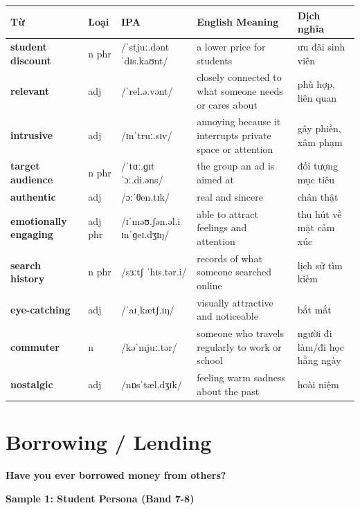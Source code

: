 \vspace{0.8em}
\begin{center}
\renewcommand{\arraystretch}{1.65}
\begin{tabularx}{\textwidth}{|V{0.22\textwidth}|C{0.07\textwidth}|I{0.20\textwidth}|Y|V{0.18\textwidth}|}
\hline
{}
\textbf{Từ} & \textbf{Loại} & \textbf{IPA} & \textbf{English Meaning} & \textbf{Dịch nghĩa} \\
\hline
\textbf{student discount} & n phr & /ˈstjuː.dənt ˈdɪs.kaʊnt/ & a lower price for students & ưu đãi sinh viên \\ \hline
\textbf{relevant} & adj & /ˈrel.ə.vənt/ & closely connected to what someone needs or cares about & phù hợp, liên quan \\ \hline
\textbf{intrusive} & adj & /ɪnˈtruː.sɪv/ & annoying because it interrupts private space or attention & gây phiền, xâm phạm \\ \hline
\textbf{target audience} & n phr & /ˈtɑː.ɡɪt ˈɔː.di.əns/ & the group an ad is aimed at & đối tượng mục tiêu \\ \hline
\textbf{authentic} & adj & /ɔːˈθen.tɪk/ & real and sincere & chân thật \\ \hline
\textbf{emotionally engaging} & adj phr & /ɪˈməʊ.ʃən.əl.i ɪnˈɡeɪ.dʒɪŋ/ & able to attract feelings and attention & thu hút về mặt cảm xúc \\ \hline
\textbf{search history} & n phr & /sɜːtʃ ˈhɪs.tər.i/ & records of what someone searched online & lịch sử tìm kiếm \\ \hline
\textbf{eye-catching} & adj & /ˈaɪˌkætʃ.ɪŋ/ & visually attractive and noticeable & bắt mắt \\ \hline
\textbf{commuter} & n & /kəˈmjuː.tər/ & someone who travels regularly to work or school & người đi làm/đi học hằng ngày \\ \hline
\textbf{nostalgic} & adj & /nɒsˈtæl.dʒɪk/ & feeling warm sadness about the past & hoài niệm \\ \hline
\end{tabularx}
\end{center}

\newpage

\section{Borrowing / Lending}
\begin{ieltsquestion}
\textbf{Have you ever borrowed money from others?}
\end{ieltsquestion}
\textbf{Sample 1: Student Persona (Band 7-8)}

